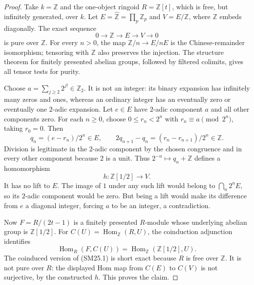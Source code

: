 \documentclass[11pt,a4paper]{article}
\theoremstyle{definition}\newtheorem{definition}[theorem]{Definition}
\theoremstyle{remark}\newtheorem{remark}[theorem]{Remark}
\begin{document}
\begin{proof}
Take $k=\mathbb Z$ and the one-object ringoid $R=\mathbb Z[t]$,
which is free, but infinitely generated, over $k$.
Let
$E=\widehat{\mathbb Z}=\prod_p\mathbb Z_p$ and $V=E/\mathbb Z$,
where $\mathbb Z$ embeds diagonally.
The exact sequence
\[
 0\longrightarrow\mathbb Z\longrightarrow E
       \longrightarrow V\longrightarrow0
 \tag{SM25.1}
\]
is pure over $\mathbb Z$. For every $n>0$, the map
$\mathbb Z/n\to E/nE$ is the Chinese-remainder isomorphism;
tensoring with $\mathbb Z$ also preserves the injection.
The structure theorem for finitely presented abelian groups,
followed by filtered colimits, gives all tensor tests for purity.

Choose $a=\sum_{j\geq2}2^{j!}\in\mathbb Z_2$.
It is not an integer: its binary expansion has infinitely many
zeros and ones, whereas an ordinary integer has an eventually
zero or eventually one $2$-adic expansion.
Let $e\in E$ have $2$-adic component $a$ and all other components
zero. For each $n\geq0$, choose
$0\leq r_n<2^n$ with $r_n\equiv a\pmod{2^n}$, taking $r_0=0$.
Then
\[
 q_n=(e-r_n)/2^n\in E,\qquad
 2q_{n+1}-q_n=(r_n-r_{n+1})/2^n\in\mathbb Z.
\]
Division is legitimate in the $2$-adic component by the chosen
congruence and in every other component because $2$ is a unit.
Thus $2^{-n}\mapsto q_n+\mathbb Z$ defines a homomorphism
\[
 h:\mathbb Z[1/2]\longrightarrow V.
\]
It has no lift to $E$. The image of $1$ under any such lift would
belong to $\bigcap_n2^n E$, so its $2$-adic component would be
zero. But being a lift would make its difference from $e$ a
diagonal integer, forcing $a$ to be an integer, a contradiction.

Now $F=R/(2t-1)$ is a finitely presented $R$-module whose
underlying abelian group is $\mathbb Z[1/2]$.
For $C(U)=\operatorname{Hom}_{\mathbb Z}(R,U)$, the coinduction
adjunction identifies
\[
 \operatorname{Hom}_R(F,C(U))
       =\operatorname{Hom}_{\mathbb Z}(\mathbb Z[1/2],U).
\]
The coinduced version of (SM25.1) is short exact because
$R$ is free over $\mathbb Z$. It is not pure over $R$:
the displayed Hom map from $C(E)$ to $C(V)$ is not surjective,
by the constructed $h$. This proves the claim.
\end{proof}
\end{document}
